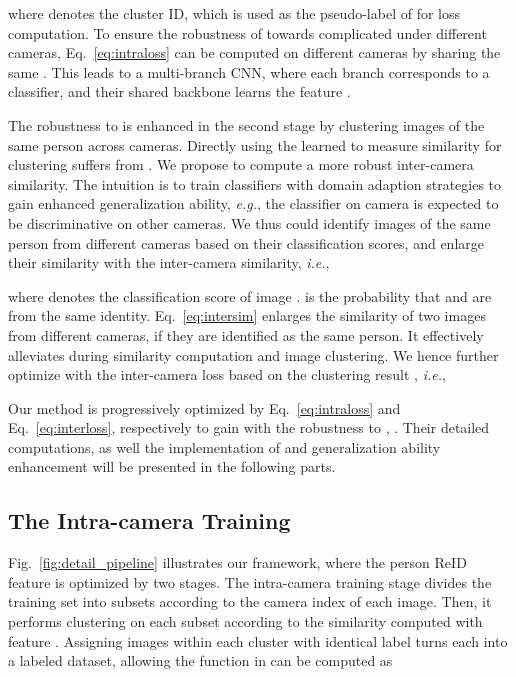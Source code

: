 \documentclass[final]{cvpr}
\begin{document}
where  denotes the cluster ID, which is used as the pseudo-label of  for loss computation. To ensure the robustness of  towards complicated  under different cameras, Eq.~\eqref{eq:intraloss} can be computed on different cameras by sharing the same . This leads to a multi-branch CNN, where each branch corresponds to a classifier, and their shared backbone learns the feature .

The robustness to  is enhanced in the second stage by clustering images of the same person across cameras. Directly using the learned  to measure similarity for clustering suffers from . We propose to compute a more robust inter-camera similarity. The intuition is to train classifiers with domain adaption strategies to gain enhanced generalization ability, \emph{e.g.}, the classifier on camera  is expected to be discriminative on other cameras. We thus could identify images of the same person from different cameras based on their classification scores, and enlarge their similarity with the inter-camera similarity, \emph{i.e.},

where  denotes the classification score of image .  is the probability that  and  are from the same identity. Eq.~\eqref{eq:intersim} enlarges the similarity of two images from different cameras, if they are identified as the same person. It effectively alleviates  during similarity computation and image clustering. We hence further optimize  with the inter-camera loss based on the clustering result , \emph{i.e.},


Our method is progressively optimized by Eq.~\eqref{eq:intraloss} and Eq.~\eqref{eq:interloss}, respectively to gain  with the robustness to , . Their detailed computations, as well the implementation of  and generalization ability enhancement will be presented in the following parts.

\subsection{The Intra-camera Training}

Fig.~\ref{fig:detail_pipeline} illustrates our framework, where the person ReID feature  is optimized by two stages. The intra-camera training stage divides the training set  into subsets  according to the camera index of each image. Then, it performs clustering on each subset according to the similarity computed with feature . Assigning images within each cluster with identical label turns each  into a labeled dataset, allowing the function  in  can be computed as
\end{document}
